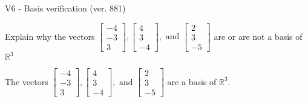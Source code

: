 \begin{exercise}
  \begin{exerciseTitle}V6 - Basis verification (ver. 881)\end{exerciseTitle}
  \begin{exerciseStatement}
    Explain why the vectors \(\left[\begin{array}{r}
-4 \\
-3 \\
3
\end{array}\right] , \left[\begin{array}{r}
4 \\
3 \\
-4
\end{array}\right] , \text{ and } \left[\begin{array}{r}
2 \\
3 \\
-5
\end{array}\right]\) are or are not a basis of \(\mathbb{R}^3\)	


  \end{exerciseStatement}
  \begin{exerciseAnswer}
   The vectors \(\left[\begin{array}{r}
-4 \\
-3 \\
3
\end{array}\right] , \left[\begin{array}{r}
4 \\
3 \\
-4
\end{array}\right] , \text{ and } \left[\begin{array}{r}
2 \\
3 \\
-5
\end{array}\right]\) 
  	 are  a basis of \(\mathbb{R}^3\).
  


  \end{exerciseAnswer}
\end{exercise}